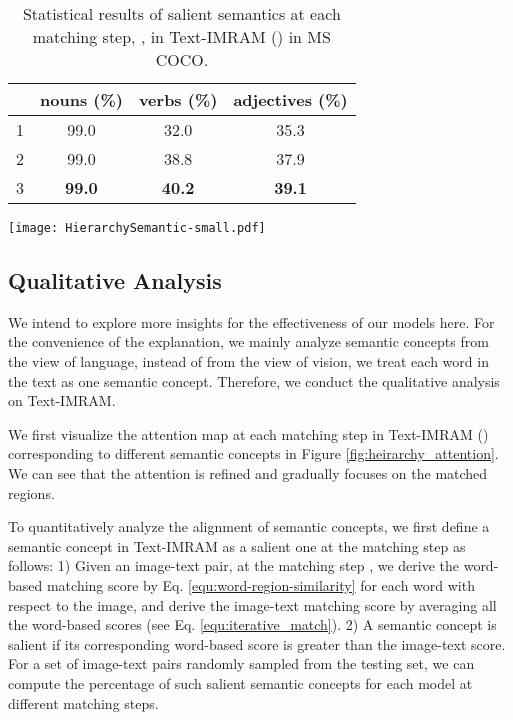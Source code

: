 \documentclass[10pt,twocolumn,letterpaper]{article}
\begin{document}
\begin{table}
\centering
\caption{Statistical results of salient semantics at each matching step, , in Text-IMRAM () in MS COCO.}\label{tab:statistical_hierarchy_k}
\begin{tabular}{c|c|c|c}
  \hline
   & nouns (\%) & verbs (\%) & adjectives (\%) \\
  \hline
  1 & 99.0 & 32.0 & 35.3 \\
  2 & 99.0 & 38.8 & 37.9 \\
  3 & \textbf{99.0} & \textbf{40.2} & \textbf{39.1} \\
  \hline
\end{tabular}\end{table}

\begin{figure*}[!t]\centering
 \texttt{[image: HierarchySemantic-small.pdf]}
  \caption{Visualization of attention at each matching step in Text-IMRAM. Corresponding matched words are in blue, followed by the matching similarity.}
  \label{fig:heirarchy_attention}
\end{figure*}

\subsection{Qualitative Analysis}
We intend to explore more insights for the effectiveness of our models here. For the convenience of the explanation, we mainly analyze semantic concepts from the view of language, instead of from the view of vision, \ie{} we treat each word in the text as one semantic concept. Therefore, we conduct the qualitative analysis on Text-IMRAM.

We first visualize the attention map at each matching step in Text-IMRAM () corresponding to different semantic concepts in Figure \ref{fig:heirarchy_attention}. We can see that the attention is refined and gradually focuses on the matched regions.

To quantitatively analyze the alignment of semantic concepts, we first define a semantic concept in Text-IMRAM as a salient one at the matching step  as follows: 1) Given an image-text pair, at the matching step , we derive the word-based matching score by Eq. \ref{equ:word-region-similarity} for each word with respect to the image, and derive the image-text matching score by averaging all the word-based scores (see Eq. \ref{equ:iterative_match}). 2) A semantic concept is salient if its corresponding word-based score is greater than the image-text score. For a set of image-text pairs randomly sampled from the testing set, we can compute the percentage of such salient semantic concepts for each model at different matching steps.
\end{document}
